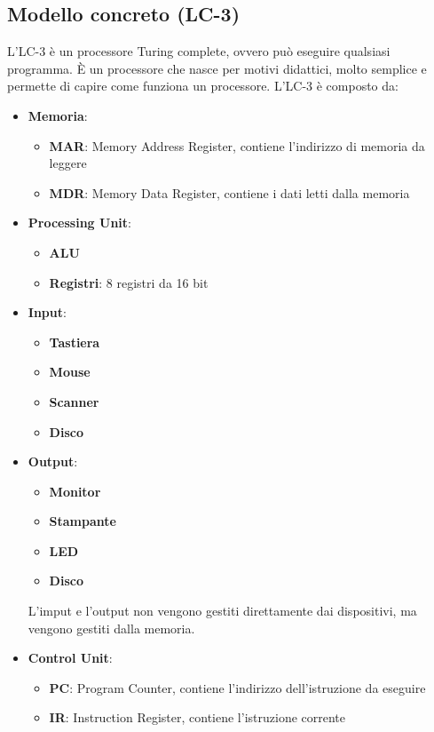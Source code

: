 \documentclass[a4paper]{article}
\theoremstyle{break}
\theoremstyle{break}
\theoremstyle{break}
\theoremstyle{break}
\begin{document}
\subsection{Modello concreto (LC-3)}
L'LC-3 è un processore Turing complete, ovvero può eseguire qualsiasi programma. È un
processore che nasce per motivi didattici, molto semplice e permette di capire come
funziona un processore. L'LC-3 è composto da:
\begin{itemize}
	\item \textbf{Memoria}:
	      \begin{itemize}
		      \item \textbf{MAR}: Memory Address Register, contiene l'indirizzo di memoria da leggere
		      \item \textbf{MDR}: Memory Data Register, contiene i dati letti dalla memoria
	      \end{itemize}
	\item \textbf{Processing Unit}:
	      \begin{itemize}
		      \item \textbf{ALU}
		      \item \textbf{Registri}: 8 registri da 16 bit
	      \end{itemize}
	\item \textbf{Input}:
	      \begin{itemize}
		      \item \textbf{Tastiera}
		      \item \textbf{Mouse}
		      \item \textbf{Scanner}
		      \item \textbf{Disco}
	      \end{itemize}
	\item \textbf{Output}:
	      \begin{itemize}
		      \item \textbf{Monitor}
		      \item \textbf{Stampante}
		      \item \textbf{LED}
		      \item \textbf{Disco}
	      \end{itemize}
	      L'imput e l'output non vengono gestiti direttamente dai dispositivi, ma vengono
	      gestiti dalla memoria.
	\item \textbf{Control Unit}:
	      \begin{itemize}
		      \item \textbf{PC}: Program Counter, contiene l'indirizzo dell'istruzione da eseguire
		      \item \textbf{IR}: Instruction Register, contiene l'istruzione corrente
	      \end{itemize}
\end{itemize}
\end{document}
